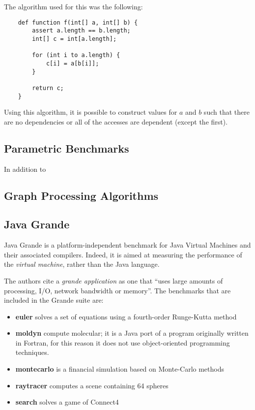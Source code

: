 	The algorithm used for this was the following:
	
	\begin{verbatim}
	def function f(int[] a, int[] b) {
	    assert a.length == b.length;
	    int[] c = int[a.length];
	    
	    for (int i to a.length) {
	        c[i] = a[b[i]];
	    }
	    
	    return c;
	}
	\end{verbatim}
	
	Using this algorithm, it is possible to construct values for $a$ and $b$ such that there are no dependencies or all of the accesses are dependent (except the first).
	
	\subsection{Parametric Benchmarks} \label{sec:methodology/benchmarks/parametric}
	In addition to 
	
	\subsection{Graph Processing Algorithms} \label{sec:methodology/benchmarks/graphs}
	
	\subsection{Java Grande} \label{sec:methodology/benchmarks/grande}
	Java Grande \citep{Smith2001,Bull2001} is a platform-independent benchmark for Java Virtual Machines and their associated compilers. Indeed, it is aimed at measuring the performance of the \emph{virtual machine}, rather than the Java language.
	
	The authors cite a \textit{grande application} as one that ``uses large amounts of processing, I/O, network bandwidth or memory''. The benchmarks that are included in the Grande suite are:
	
	\begin{itemize}
		\item \textbf{euler} solves a set of equations using a fourth-order Runge-Kutta method
		\item \textbf{moldyn} compute molecular; it is a Java port of a program originally written in Fortran, for this reason it does not use object-oriented programming techniques.
		\item \textbf{montecarlo} is a financial simulation based on Monte-Carlo methods
		\item \textbf{raytracer} computes a scene containing 64 spheres
		\item \textbf{search} solves a game of Connect4
	\end{itemize}
	
